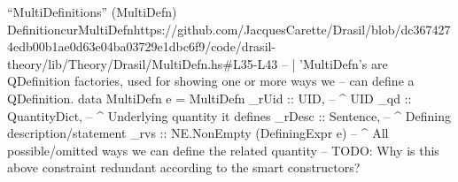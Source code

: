 \begin{haskell}{``MultiDefinitions'' (MultiDefn) Definition}{curMultiDefn}{https://github.com/JacquesCarette/Drasil/blob/dc3674274edb00b1ae0d63e04ba03729e1dbc6f9/code/drasil-theory/lib/Theory/Drasil/MultiDefn.hs\#L35-L43}
-- | 'MultiDefn's are QDefinition factories, used for showing one or more ways we
--   can define a QDefinition.
data MultiDefn e = MultiDefn {
    _rUid  :: UID,                         -- ^ UID
    _qd    :: QuantityDict,                -- ^ Underlying quantity it defines
    _rDesc :: Sentence,                    -- ^ Defining description/statement
    _rvs   :: NE.NonEmpty (DefiningExpr e) -- ^ All possible/omitted ways we can define the related quantity
           -- TODO: Why is this above constraint redundant according to the smart constructors?
}
\end{haskell}

